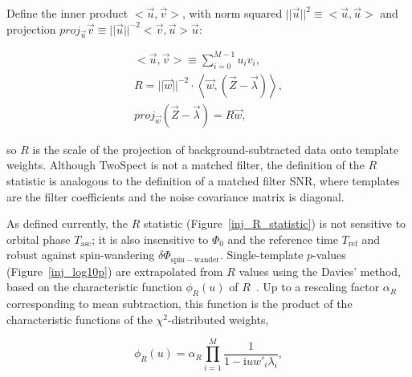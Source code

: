 \noindent Define the inner product $<\vec{u}, \vec{v}>$, with norm squared $||\vec{u}||^2 \equiv <\vec{u}, \vec{u}>$ and projection $\mathit{proj}_{\vec{u}} \vec{v} \equiv ||\vec{u}||^{-2} <\vec{v}, \vec{u}> \vec{u}$:

\begin{eqnarray}
<\vec{u}, \vec{v}> \equiv \sum_{i=0}^{M-1} u_i v_i,\\
R = ||\vec{w}||^{-2} \cdot \left<\vec{w}, (\vec{Z} - \vec{\lambda})\right>,\\
\mathit{proj}_{\vec{w}} \left(\vec{Z} - \vec{\lambda} \right) = R \vec{w},
\label{TwoSpect_R_statistic_as_projection}
\end{eqnarray}

\noindent so $R$ is the scale of the projection of background-subtracted data onto template weights.
Although TwoSpect is not a matched filter, the definition of the $R$ statistic is analogous to the definition of a matched filter SNR, where templates are the filter coefficients and the noise covariance matrix is diagonal.




As defined currently, the $R$ statistic 
(Figure~\ref{inj_R_statistic})
is not sensitive to orbital phase $T_\mathrm{asc}$; it is also insensitive to $\Phi_0$ and the reference time $T_\mathrm{ref}$ and robust against spin-wandering $\delta \Phi_\mathrm{spin-wander}$.
Single-template $p$-values (Figure~\ref{inj_log10p}) are extrapolated from $R$ values using the Davies' method, based on the characteristic function $\phi_R (u)$ of $R$~\cite{GoetzTwoSpectMethods2011}.
Up to a rescaling factor $\alpha_R$ corresponding to mean subtraction, this function is the product of the characteristic functions of the $\chi^2$-distributed weights, 

\begin{equation}
\phi_R(u) = \alpha_R \prod\limits_{i=1}^{M} \frac{1}{1 - \mathrm{i} u w'_i \lambda_i},
\end{equation}

